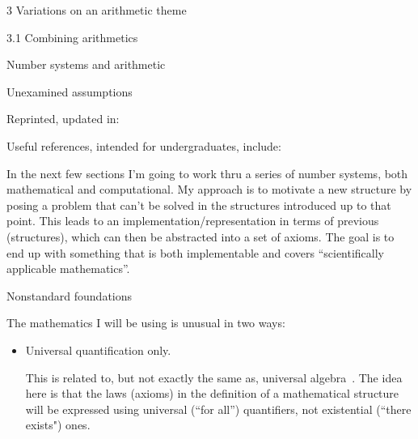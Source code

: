 \documentclass[12pt]{PalisadesLakesBook}
\begin{document}
\begin{plSection}{3 Variations on an arithmetic theme}
\begin{plSection}{3.1 Combining arithmetics}
\begin{plSection}{Number systems and arithmetic}
\begin{plSection}{Unexamined assumptions}

Reprinted, updated in:




Useful references, intended for undergraduates, include:
 



In the next few sections I'm going to work thru a series
of number systems, both mathematical and computational.
My approach is to motivate a new structure
by posing a problem that can't be solved in the structures
introduced up to that point.
This leads to an implementation/representation
in terms of previous (structures),
which can then be abstracted into a set of axioms.
The goal is to end up with something that is both
implementable and covers ``scientifically applicable mathematics''.

\end{plSection}%
\begin{plSection}{Nonstandard foundations}

The mathematics I will be using is unusual in two ways:

\begin{itemize}
  
\item Universal quantification only.

This is related to, but not exactly the same as,
universal algebra~\cite{wiki:UniversalAlgebra}.
The idea here is that the laws (axioms) 
in the definition of a mathematical structure
will be expressed using
universal (``for all'') quantifiers, 
not existential (``there exists") ones.


\end{itemize}
\end{plSection}
\end{plSection}
\end{plSection}
\end{plSection}
\end{document}
